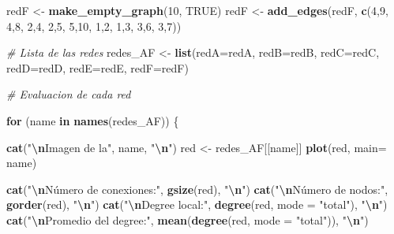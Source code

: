 \documentclass[
]{article}
\newenvironment{Shaded}{\begin{snugshade}}{\end{snugshade}}
\newcommand{\AttributeTok}[1]{\textcolor[rgb]{0.13,0.29,0.53}{#1}}
\newcommand{\CommentTok}[1]{\textcolor[rgb]{0.56,0.35,0.01}{\textit{#1}}}
\newcommand{\ConstantTok}[1]{\textcolor[rgb]{0.56,0.35,0.01}{#1}}
\newcommand{\ControlFlowTok}[1]{\textcolor[rgb]{0.13,0.29,0.53}{\textbf{#1}}}
\newcommand{\DecValTok}[1]{\textcolor[rgb]{0.00,0.00,0.81}{#1}}
\newcommand{\FunctionTok}[1]{\textcolor[rgb]{0.13,0.29,0.53}{\textbf{#1}}}
\newcommand{\NormalTok}[1]{#1}
\newcommand{\OtherTok}[1]{\textcolor[rgb]{0.56,0.35,0.01}{#1}}
\newcommand{\SpecialCharTok}[1]{\textcolor[rgb]{0.81,0.36,0.00}{\textbf{#1}}}
\newcommand{\StringTok}[1]{\textcolor[rgb]{0.31,0.60,0.02}{#1}}
\begin{document}
\begin{Shaded}
\begin{Highlighting}[]
\NormalTok{redF }\OtherTok{\textless{}{-}} \FunctionTok{make\_empty\_graph}\NormalTok{(}\DecValTok{10}\NormalTok{, }\ConstantTok{TRUE}\NormalTok{)}
\NormalTok{redF }\OtherTok{\textless{}{-}} \FunctionTok{add\_edges}\NormalTok{(redF, }\FunctionTok{c}\NormalTok{(}\DecValTok{4}\NormalTok{,}\DecValTok{9}\NormalTok{, }\DecValTok{4}\NormalTok{,}\DecValTok{8}\NormalTok{, }\DecValTok{2}\NormalTok{,}\DecValTok{4}\NormalTok{, }\DecValTok{2}\NormalTok{,}\DecValTok{5}\NormalTok{, }\DecValTok{5}\NormalTok{,}\DecValTok{10}\NormalTok{, }\DecValTok{1}\NormalTok{,}\DecValTok{2}\NormalTok{, }\DecValTok{1}\NormalTok{,}\DecValTok{3}\NormalTok{, }\DecValTok{3}\NormalTok{,}\DecValTok{6}\NormalTok{, }\DecValTok{3}\NormalTok{,}\DecValTok{7}\NormalTok{))}

\CommentTok{\# Lista de las redes}
\NormalTok{redes\_AF }\OtherTok{\textless{}{-}} \FunctionTok{list}\NormalTok{(}\AttributeTok{redA=}\NormalTok{redA, }\AttributeTok{redB=}\NormalTok{redB, }\AttributeTok{redC=}\NormalTok{redC, }\AttributeTok{redD=}\NormalTok{redD, }\AttributeTok{redE=}\NormalTok{redE, }\AttributeTok{redF=}\NormalTok{redF)}

\CommentTok{\# Evaluacion de cada red}

\ControlFlowTok{for}\NormalTok{ (name }\ControlFlowTok{in} \FunctionTok{names}\NormalTok{(redes\_AF)) \{}
  
  \FunctionTok{cat}\NormalTok{(}\StringTok{"}\SpecialCharTok{\textbackslash{}n}\StringTok{Imagen de la"}\NormalTok{, name, }\StringTok{"}\SpecialCharTok{\textbackslash{}n}\StringTok{"}\NormalTok{)}
\NormalTok{  red }\OtherTok{\textless{}{-}}\NormalTok{ redes\_AF[[name]]}
  \FunctionTok{plot}\NormalTok{(red, }\AttributeTok{main=}\NormalTok{ name)}
  
  \FunctionTok{cat}\NormalTok{(}\StringTok{"}\SpecialCharTok{\textbackslash{}n}\StringTok{Número de conexiones:"}\NormalTok{, }\FunctionTok{gsize}\NormalTok{(red), }\StringTok{"}\SpecialCharTok{\textbackslash{}n}\StringTok{"}\NormalTok{) }
  \FunctionTok{cat}\NormalTok{(}\StringTok{"}\SpecialCharTok{\textbackslash{}n}\StringTok{Número de nodos:"}\NormalTok{, }\FunctionTok{gorder}\NormalTok{(red), }\StringTok{"}\SpecialCharTok{\textbackslash{}n}\StringTok{"}\NormalTok{)}
  \FunctionTok{cat}\NormalTok{(}\StringTok{"}\SpecialCharTok{\textbackslash{}n}\StringTok{Degree local:"}\NormalTok{, }\FunctionTok{degree}\NormalTok{(red, }\AttributeTok{mode =} \StringTok{"total"}\NormalTok{), }\StringTok{"}\SpecialCharTok{\textbackslash{}n}\StringTok{"}\NormalTok{) }
  \FunctionTok{cat}\NormalTok{(}\StringTok{"}\SpecialCharTok{\textbackslash{}n}\StringTok{Promedio del degree:"}\NormalTok{, }\FunctionTok{mean}\NormalTok{(}\FunctionTok{degree}\NormalTok{(red, }\AttributeTok{mode =} \StringTok{"total"}\NormalTok{)), }\StringTok{"}\SpecialCharTok{\textbackslash{}n}\StringTok{"}\NormalTok{)}
  

\end{Highlighting}
\end{Shaded}
\end{document}
